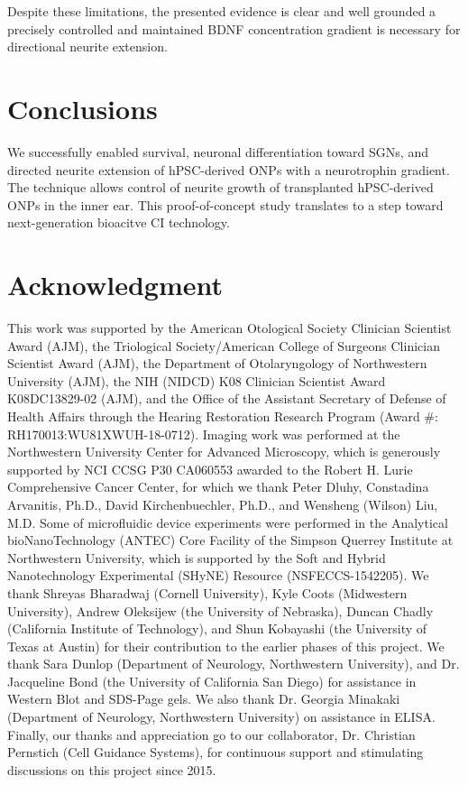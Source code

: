 \documentclass[review]{elsarticle}
\begin{document}
\indent Despite these limitations, the presented evidence is clear and well grounded \textendash a precisely controlled and maintained BDNF concentration gradient is necessary for directional neurite extension.

\section* {Conclusions}
We successfully enabled survival, neuronal differentiation toward SGNs, and directed neurite extension of hPSC-derived ONPs with a neurotrophin gradient. The technique allows control of neurite growth of transplanted hPSC-derived ONPs in the inner ear. This proof-of-concept study translates to a step toward next-generation bioacitve CI technology. 

\section* {Acknowledgment}	
This work was supported by the American Otological Society Clinician Scientist Award (AJM), the Triological Society/American College of Surgeons Clinician Scientist Award (AJM), the Department of Otolaryngology of Northwestern University (AJM), the NIH (NIDCD) K08 Clinician Scientist Award K08DC13829-02 (AJM), and the Office of the Assistant Secretary of Defense of Health Affairs through the Hearing Restoration Research Program (Award \#: RH170013:WU81XWUH-18-0712). Imaging work was performed at the Northwestern University Center for Advanced Microscopy, which is generously supported by NCI CCSG P30 CA060553 awarded to the Robert H. Lurie Comprehensive Cancer Center, for which we thank Peter Dluhy, Constadina Arvanitis, Ph.D., David Kirchenbuechler, Ph.D., and Wensheng (Wilson) Liu, M.D.  Some of microfluidic device experiments were performed in the Analytical bioNanoTechnology (ANTEC) Core Facility of the Simpson Querrey Institute at Northwestern University, which is supported by the Soft and Hybrid Nanotechnology Experimental (SHyNE) Resource (NSFECCS-1542205). We thank Shreyas Bharadwaj (Cornell University), Kyle Coots (Midwestern University), Andrew Oleksijew (the University of Nebraska), Duncan Chadly (California Institute of Technology), and Shun Kobayashi (the University of Texas at Austin) for their contribution to the earlier phases of this project. We thank Sara Dunlop (Department of Neurology, Northwestern University), and Dr. Jacqueline Bond (the University of California San Diego) for assistance in Western Blot and SDS-Page gels. We also thank Dr. Georgia Minakaki (Department of Neurology, Northwestern University) on assistance in ELISA. Finally, our thanks and appreciation go to our collaborator, Dr. Christian Pernstich (Cell Guidance Systems), for continuous support and stimulating discussions on this project since 2015. 





\end{document}
